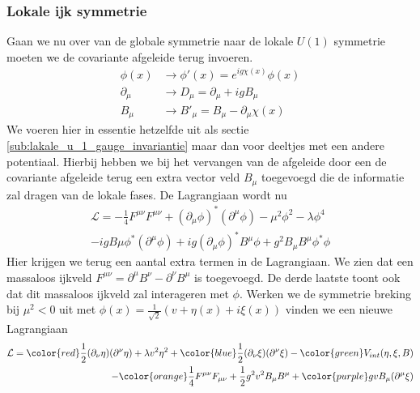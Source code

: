 \documentclass[../main.tex]{subfiles}
\begin{document}
\subsubsection{Lokale ijk symmetrie}%
\label{ssub:lokale_ijk_symmetrie}

Gaan we nu over van de globale symmetrie naar de lokale $U(1)$ symmetrie moeten we de covariante afgeleide terug invoeren.
\begin{equation}
    \begin{aligned}
        \label{eq:complex_scalair_veld_lokaal}
        \phi(x) &\rightarrow \phi'(x) = e^{ig\chi(x)}\phi(x)\\
        \partial_\mu &\rightarrow D_\mu = \partial_\mu + igB_\mu\\
        B_\mu &\rightarrow B'_\mu = B_\mu - \partial_\mu \chi(x)
    \end{aligned}
\end{equation}
We voeren hier in essentie hetzelfde uit als sectie \ref{sub:lakale_u_1_gauge_invariantie} maar dan voor deeltjes met een andere potentiaal. Hierbij hebben we bij het vervangen van de afgeleide door een de covariante afgeleide terug een extra vector veld $B_\mu$ toegevoegd die de informatie zal dragen van de lokale fases. De Lagrangiaan wordt nu
\begin{equation}
    \begin{aligned}
        \label{eq:comp_scal_veld_lagr_lok_symm}
        \mathcal{L} = - \frac{1}{4} F^{\mu\nu}F^{\mu\nu} + (\partial_\mu \phi)^*(\partial^\mu \phi)-\mu^2\phi^2-\lambda\phi^4\\
        - igB\mu \phi^* (\partial^\mu \phi) + ig (\partial_\mu \phi)^* B^\mu \phi + g^2 B_\mu B^\mu \phi^* \phi
    \end{aligned}
\end{equation}
Hier krijgen we terug een aantal extra termen in de Lagrangiaan. We zien dat een massaloos ijkveld $F^{\mu\nu} = \partial^\mu B^\nu - \partial^\nu B^\mu$ is toegevoegd. De derde laatste toont ook dat dit massaloos ijkveld zal interageren met $\phi$. Werken we de symmetrie breking bij $\mu^2<0$ uit met $\phi(x)= \frac{1}{\sqrt{2}} (v + \eta(x) + i\xi(x))$ vinden we een nieuwe Lagrangiaan
\begin{equation}
    \begin{aligned}
        \label{eq:comp_scal_veld_lagr_lok_symm_breking}
        \mathcal{L} = {\color{red}\frac{1}{2} (\partial_\nu\eta)(\partial^\nu\eta) + \lambda v^2\eta^2} + {\color{blue}\frac{1}{2} (\partial_\nu\xi)(\partial^\nu\xi)} - {\color{green}V_{int}(\eta,\xi,B)}\\
        - {\color{orange}\frac{1}{4} F^{\mu\nu}F_{\mu\nu} + \frac{1}{2} g^2v^2B_\mu B^\mu} + {\color{purple}gvB_\mu(\partial^\mu \xi)}
    \end{aligned}
\end{equation}
\end{document}
